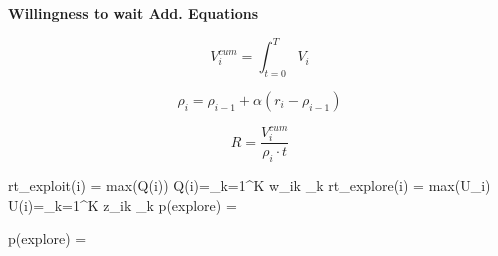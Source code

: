 \documentclass[fleqn]{article}
\begin{document}
\textbf{Willingness to wait Add. Equations}

\begin{equation*}
  V^{cum}_i= \int^T_{t=0}V_i
\end{equation*}

\begin{equation*}
  \rho_i = \rho_{i-1} + \alpha(r_i - \rho_{i-1})
\end{equation*}

\begin{equation*}
  R =  \frac{V^{cum}_i}{\rho_i \cdot t}
\end{equation*}


\textrm{rt}_\textrm{exploit}(i) = \textrm{max}(Q(i))
Q(i)=\displaystyle\sum_{k=1}^{K}  w_{ik} \cdot \varphi_k
\textrm{rt}_\textrm{explore}(i) = \textrm{max}(U_i)
U(i)=\displaystyle\sum_{k=1}^{K}  z_{ik} \cdot \varphi_k
  \textrm{p}(explore) = 
  
  p(\textrm{explore}) = 
\end{document}
